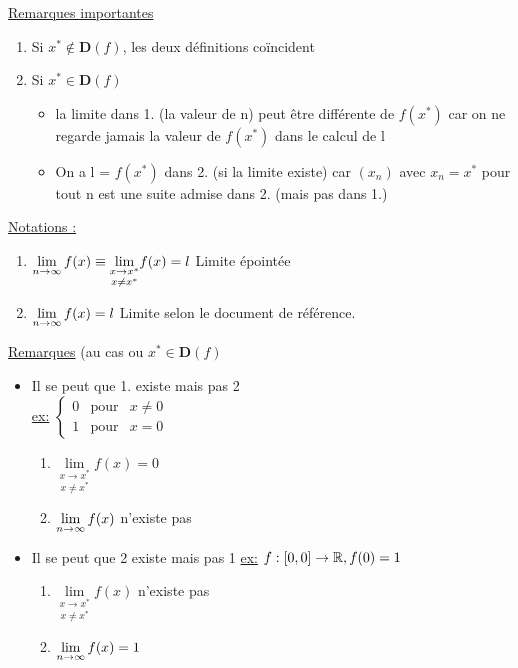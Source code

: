 \documentclass[12pt,a4paper]{article}
\begin{document}
{\begin{boite}
\underline{Remarques importantes}
	\begin{enumerate}
		\item Si $x^* \not \in \mathbf{D}(f)$, les deux définitions coïncident
		\item Si $x^* \in \mathbf{D}(f)$
			\begin{itemize}
				\item la limite dans 1. (la valeur de n) peut être différente de $f(x^*)$ car on ne regarde jamais la valeur de $f(x^*)$ dans le calcul de l
				\item On a l = $f(x^*)$ dans 2. (si la limite existe) car $(x_n)$ avec $x_n = x^*$ pour tout n est une suite admise dans 2. (mais pas dans 1.)
			\end{itemize}
	\end{enumerate}
\end{boite}

\underline{Notations :}
\begin{boite}
	\begin{enumerate}
		\item $\lim\limits_{n \to \infty} f(x) \equiv \underset{x \neq x^*}{\lim\limits_{x \to x^*}} f(x) = l$ Limite épointée
		\item $\lim\limits_{n \to \infty} f(x) = l$ Limite selon le document de référence.
	\end{enumerate}
\end{boite}

\underline{Remarques} (au cas ou $x^* \in \mathbf{D}(f)$\\
\begin{itemize}
\item Il se peut que 1. existe mais pas 2 \\
\underline{ex:}
$\left\{
\begin{array}{lll}
0 & \mbox{pour} & x \neq 0\\
1 & \mbox{pour} & x = 0
\end{array}
\right.$
\begin{enumerate}
\item $\underset{x \neq x^*}{\lim\limits_{x \to x^*}} f(x) = 0$
\item $\lim\limits_{n \to \infty} f(x)$ n'existe pas
\end{enumerate}
\item Il se peut que 2 existe mais pas 1
\underline{ex:} $f:[0,0] \to \mathbb{R}, f(0) = 1$
\begin{enumerate}
\item $\underset{x \neq x^*}{\lim\limits_{x \to x^*}} f(x)$ n'existe pas
\item $\lim\limits_{n \to \infty} f(x) = 1$
\end{enumerate}
\end{itemize}

}
\end{document}
